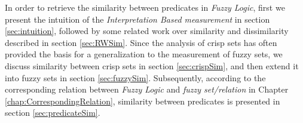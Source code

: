 In order to retrieve the similarity between predicates in \textit{Fuzzy Logic}, first we present the intuition of the 
\textit{Interpretation Based measurement} in section \ref{sec:intuition}, followed by  some related work over similarity and dissimilarity described in section \ref{sec:RWSim}. Since the analysis of crisp sets has often provided the basis for a generalization to the measurement of fuzzy sets, we discuss similarity between crisp sets in section \ref{sec:crispSim}, and then extend it into fuzzy sets in section \ref{sec:fuzzySim}.  Subsequently, according to the corresponding relation between \textit{Fuzzy Logic} and  \textit{fuzzy set/relation} in Chapter \ref{chap:CorrespondingRelation}, similarity between predicates is presented in section \ref{sec:predicateSim}.  